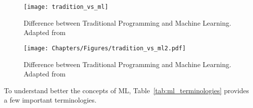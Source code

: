 \begin{figure}[htbp]
    \centering
    \texttt{[image: tradition\_vs\_ml]}
    \caption{Difference between Traditional Programming and Machine Learning. Adapted from~\cite{Kassel2017PredictingAzavea}}
    \label{fig:tradition_vs_ml}
\end{figure}

\begin{figure}[htbp]
    \centering
    \texttt{[image: Chapters/Figures/tradition\_vs\_ml2.pdf]}
    \caption{Difference between Traditional Programming and Machine Learning. Adapted from~\cite{Kassel2017PredictingAzavea}}
    \label{fig:tradition_vs_ml}
\end{figure}

To understand better the concepts of \gls{ML}, Table~\ref{tab:ml_terminologies} provides a few important terminologies.

